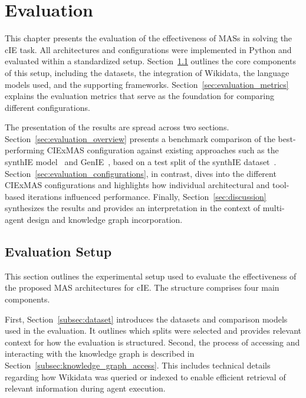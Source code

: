 \documentclass[a4paper,oneside,bibliography=totoc]{scrbook}
\begin{document}
\chapter{Evaluation}
\label{ch:evaluation}

This chapter presents the evaluation of the effectiveness of \acp{MAS} in solving the \ac{cIE} task. All architectures and configurations were implemented in Python and evaluated within a standardized setup. Section~\ref{sec:evaluation_setup} outlines the core components of this setup, including the datasets, the integration of Wikidata, the language models used, and the supporting frameworks. Section~\ref{sec:evaluation_metrics} explains the evaluation metrics that serve as the foundation for comparing different configurations.

The presentation of the results are spread across two sections. Section~\ref{sec:evaluation_overview} presents a benchmark comparison of the best-performing CIExMAS configuration against existing approaches such as the synthIE model~\cite{Josifoski2023} and GenIE~\cite{Josifoski2021}, based on a test split of the synthIE dataset~\cite{Josifoski2023}. Section~\ref{sec:evaluation_configurations}, in contrast, dives into the different CIExMAS configurations and highlights how individual architectural and tool-based iterations influenced performance. Finally, Section~\ref{sec:discussion} synthesizes the results and provides an interpretation in the context of multi-agent design and knowledge graph incorporation.

\section{Evaluation Setup}
\label{sec:evaluation_setup}

This section outlines the experimental setup used to evaluate the effectiveness of the proposed \ac{MAS} architectures for \ac{cIE}. The structure comprises four main components.

First, Section~\ref{subsec:dataset} introduces the datasets and comparison models used in the evaluation. It outlines which splits were selected and provides relevant context for how the evaluation is structured. Second, the process of accessing and interacting with the knowledge graph is described in Section~\ref{subsec:knowledge_graph_access}. This includes technical details regarding how Wikidata was queried or indexed to enable efficient retrieval of relevant information during agent execution.
\end{document}
